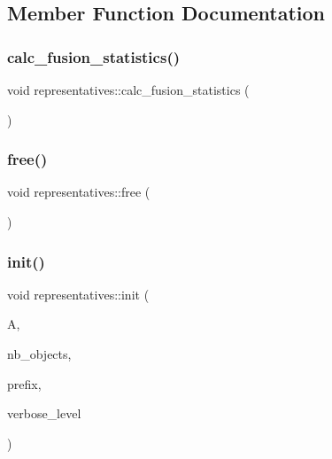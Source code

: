 \subsection{Member Function Documentation}
\mbox{\label{classrepresentatives_ac776d4e7be572086b4daed9addafe785}} 
\subsubsection{\texorpdfstring{calc\+\_\+fusion\+\_\+statistics()}{calc\_fusion\_statistics()}}
{\footnotesize\ttfamily void representatives\+::calc\+\_\+fusion\+\_\+statistics (\begin{DoxyParamCaption}{ }\end{DoxyParamCaption})}

\mbox{\label{classrepresentatives_a224f85f22dd0406a97e626551beb9445}} 
\subsubsection{\texorpdfstring{free()}{free()}}
{\footnotesize\ttfamily void representatives\+::free (\begin{DoxyParamCaption}{ }\end{DoxyParamCaption})}

\mbox{\label{classrepresentatives_ae3d1d5911e48bb0086264840f942370e}} 
\subsubsection{\texorpdfstring{init()}{init()}}
{\footnotesize\ttfamily void representatives\+::init (\begin{DoxyParamCaption}\item[{\mbox{\hyperlink{classaction}{action}} $\ast$}]{A,  }\item[{\mbox{\hyperlink{galois_8h_a09fddde158a3a20bd2dcadb609de11dc}{I\+NT}}}]{nb\+\_\+objects,  }\item[{\mbox{\hyperlink{galois_8h_ab6cc7b4aeb6ea31aba2b3fbfc83ff5e6}{B\+Y\+TE}} $\ast$}]{prefix,  }\item[{\mbox{\hyperlink{galois_8h_a09fddde158a3a20bd2dcadb609de11dc}{I\+NT}}}]{verbose\+\_\+level }\end{DoxyParamCaption})}

